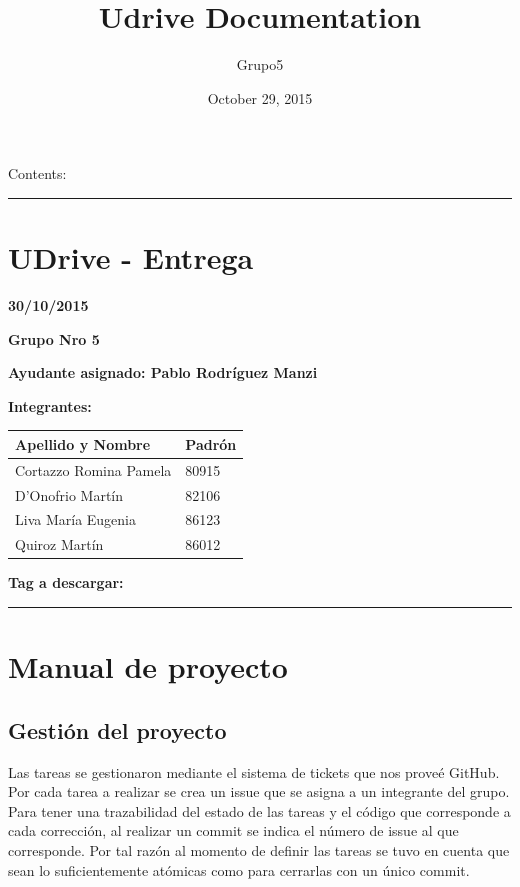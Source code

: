 \documentclass[letterpaper,10pt,english]{sphinxmanual}
\title{Udrive Documentation}
\date{October 29, 2015}
\author{Grupo5}
\begin{document}
\maketitle
\tableofcontents
{}\label{index::doc}


Contents:


\bigskip\hrule{}\bigskip



\chapter{UDrive - Entrega}
\label{uDriveDoc:welcome-to-udrive-s-documentation}\label{uDriveDoc:udrive-entrega}\label{uDriveDoc::doc}
\textbf{30/10/2015}

\textbf{Grupo Nro 5}

\textbf{Ayudante asignado: Pablo Rodríguez Manzi}

\textbf{Integrantes:}

\begin{tabulary}{\linewidth}{|L|L|}
\hline
\textsf{\relax 
Apellido y Nombre
} & \textsf{\relax 
Padrón
}\\
\hline
Cortazzo Romina Pamela
 & 
80915
\\
\hline
D'Onofrio Martín
 & 
82106
\\
\hline
Liva María Eugenia
 & 
86123
\\
\hline
Quiroz Martín
 & 
86012
\\
\hline\end{tabulary}


\textbf{Tag a descargar:}


\bigskip\hrule{}\bigskip



\chapter{Manual de proyecto}
\label{uDriveDoc:manual-de-proyecto}

\section{Gestión del proyecto}
\label{uDriveDoc:gestion-del-proyecto}
Las tareas se gestionaron mediante el sistema de tickets que nos proveé GitHub. Por cada tarea a realizar se crea un issue que se asigna a un integrante del grupo.
Para tener una trazabilidad del estado de las tareas y el código que corresponde a cada corrección, al realizar un commit se indica el número de issue al que corresponde. Por tal razón al momento de  definir las tareas se tuvo en cuenta que sean lo suficientemente atómicas como para cerrarlas con un único commit.
\end{document}
